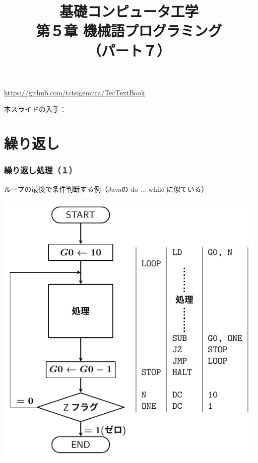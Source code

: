 \documentclass[handout]{beamer}        %
\begin{document}
\title{基礎コンピュータ工学\\第５章 機械語プログラミング\\（パート７）}
\date{}

\begin{frame}
  \titlepage
  \centerline{\url{https://github.com/tctsigemura/TecTextBook}}
  \vfill
  \centerline{本スライドの入手：
    }
\end{frame}


\section{繰り返し}
\begin{frame}
  \frametitle{繰り返し処理（１）}
  ループの最後で条件判断する例（Javaの do ... while に似ている）\\
  \vfill
  \centerline{\includegraphics[scale=0.7]{../Tikz/flow2.pdf}}
  \vfill
\end{frame}
\end{document}
